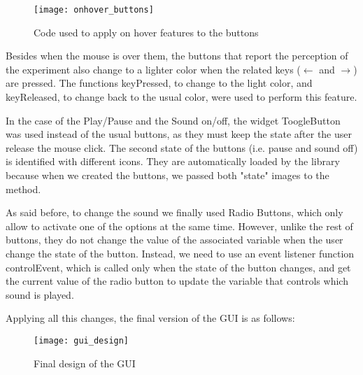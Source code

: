 \begin{figure}[!ht]
		\centering
		\vspace{0.5cm}
		\texttt{[image: onhover\_buttons]}
		\caption{Code used to apply on hover features to the buttons}
\end{figure} 

 Besides when the mouse is over them, the buttons that report the perception of the experiment also change to a lighter color when the related keys ($\leftarrow$ and $\rightarrow$) are pressed. The functions keyPressed, to change to the light color, and keyReleased, to change back to the usual color, were used to perform this feature.

In the case of the Play/Pause and the Sound on/off, the widget ToogleButton was used instead of the usual buttons, as they must keep the state after the user release the mouse click. The second state of the buttons (i.e. pause and sound off) is identified with different icons. They are automatically loaded by the library because when we created the buttons, we passed both "state" images to the method.

As said before, to change the sound we finally used Radio Buttons, which only allow to activate one of the options at the same time. However, unlike the rest of buttons, they do not change the value of the associated variable when the user change the state of the button. Instead, we need to use an event listener function controlEvent, which is called only when the state of the button changes, and get the current value of the radio button to update the variable that controls which sound is played.

Applying all this changes, the final version of the GUI is as follows:

\begin{figure}[!ht]
		\centering
		\vspace{0.5cm}
		\texttt{[image: gui\_design]}
		\caption{Final design of the GUI}
\end{figure} 






